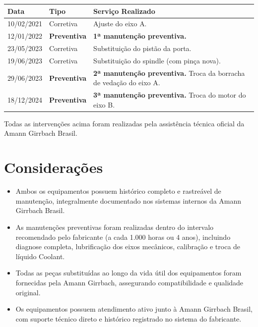 \documentclass[12pt, a4paper]{article}
\begin{document}
\begin{table}[H]
    \centering
    \small
    \renewcommand{\arraystretch}{1.3}
    \begin{tabularx}{\textwidth}{@{} p{2cm} p{2.8cm} X @{}}
        \toprule
        \rowcolor{tableHeader} \textbf{Data} & \textbf{Tipo} & \textbf{Serviço Realizado} \\
        \midrule
        10/02/2021 & Corretiva & Ajuste do eixo A. \\
        \rowcolor{lightGray}
        12/01/2022 & \textcolor{successGreen}{\textbf{Preventiva}} & \textbf{1ª manutenção preventiva.} \\
        23/05/2023 & Corretiva & Substituição do pistão da porta. \\
        \rowcolor{lightGray}
        19/06/2023 & Corretiva & Substituição do spindle (com pinça nova). \\
        29/06/2023 & \textcolor{successGreen}{\textbf{Preventiva}} & \textbf{2ª manutenção preventiva.} Troca da borracha de vedação do eixo A. \\
        \rowcolor{lightGray}
        18/12/2024 & \textcolor{successGreen}{\textbf{Preventiva}} & \textbf{3ª manutenção preventiva.} Troca do motor do eixo B. \\
        \bottomrule
    \end{tabularx}
\end{table}

Todas as intervenções acima foram realizadas pela assistência técnica oficial da Amann Girrbach Brasil.

\pagebreak

\section{Considerações}

\begin{itemize}[leftmargin=1.5cm, itemsep=0.5cm]
    \item Ambos os equipamentos possuem histórico completo e rastreável de manutenção, integralmente documentado nos sistemas internos da Amann Girrbach Brasil.

    \item As manutenções preventivas foram realizadas dentro do intervalo recomendado pelo fabricante (a cada 1.000 horas ou 4 anos), incluindo diagnose completa, lubrificação dos eixos mecânicos, calibração e troca de líquido Coolant.

    \item Todas as peças substituídas ao longo da vida útil dos equipamentos foram fornecidas pela Amann Girrbach, assegurando compatibilidade e qualidade original.

    \item Os equipamentos possuem atendimento ativo junto à Amann Girrbach Brasil, com suporte técnico direto e histórico registrado no sistema do fabricante.
\end{itemize}
\end{document}
